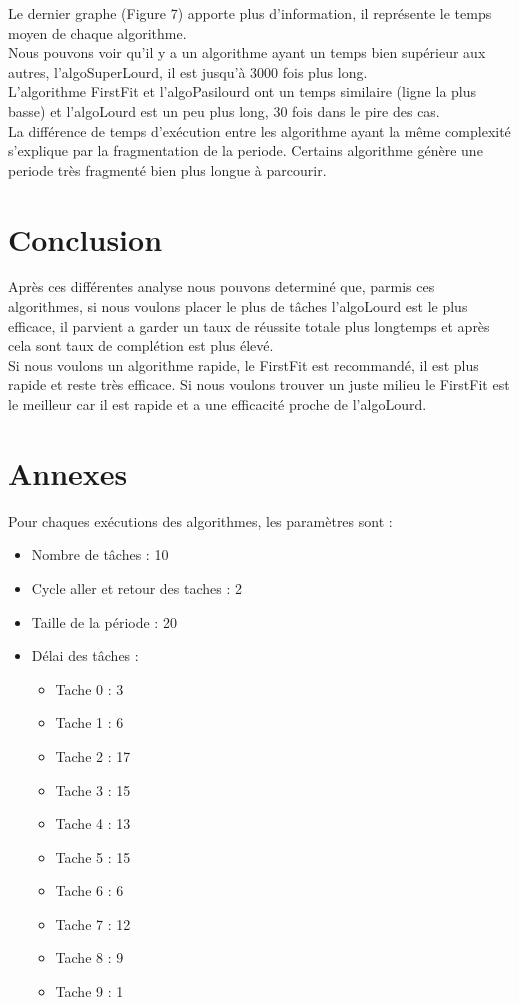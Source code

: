 \documentclass[11pt]{article}
\begin{document}
Le dernier graphe (Figure 7) apporte plus d'information, il représente le temps moyen de chaque algorithme.\\
Nous pouvons voir qu'il y a un algorithme ayant un temps bien supérieur aux autres, l'algoSuperLourd, il est jusqu'à 3000 fois plus long.\\
L'algorithme FirstFit et l'algoPasilourd ont un temps similaire (ligne la plus basse) et l'algoLourd est un peu plus long, 30 fois dans le pire des cas.\\
La différence de temps d'exécution entre les algorithme ayant la même complexité s'explique par la fragmentation de la periode. Certains algorithme génère une periode très fragmenté bien plus longue à parcourir.


\section{Conclusion}

Après ces différentes analyse nous pouvons determiné que, parmis ces algorithmes, si nous voulons placer le plus de tâches l'algoLourd est le plus efficace, il parvient a garder un taux de réussite totale plus longtemps et après cela sont taux de complétion est plus élevé.\\
Si nous voulons un algorithme rapide, le FirstFit est recommandé, il est plus rapide et reste très efficace. Si nous voulons trouver un juste milieu le FirstFit est le meilleur car il est rapide et a une efficacité proche de l'algoLourd.\\

\newpage
\section{Annexes}
Pour chaques exécutions des algorithmes, les paramètres sont :
\begin{itemize}
    \item Nombre de tâches : 10
    \item Cycle aller et retour des taches : 2
    \item Taille de la période : 20
    \item Délai des tâches :
    \begin{itemize}
        \item Tache 0 : 3
        \item Tache 1 : 6
        \item Tache 2 : 17
        \item Tache 3 : 15
        \item Tache 4 : 13
        \item Tache 5 : 15
        \item Tache 6 : 6
        \item Tache 7 : 12
        \item Tache 8 : 9
        \item Tache 9 : 1
    \end{itemize}
\end{itemize}
\end{document}

